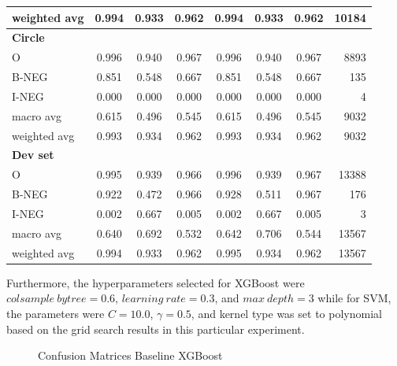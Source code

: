 \begin{table}[!ht]
\begin{tabular}{lccc|cccr}
weighted avg       &  0.994 &  0.933 &  0.962 & 0.994 & 0.933 & 0.962 & 10184 \\
\hline
\textbf{Circle}    &        &        &        &       &       &       &   \\
O                  &  0.996 &  0.940 &  0.967 & 0.996 & 0.940 & 0.967 & 8893 \\
B-NEG              &  0.851 &  0.548 &  0.667 & 0.851 & 0.548 & 0.667 & 135 \\
I-NEG              &  0.000 &  0.000 &  0.000 & 0.000 & 0.000 & 0.000 & 4 \\
macro avg          &  0.615 &  0.496 &  0.545 & 0.615 & 0.496 & 0.545 & 9032 \\
weighted avg       &  0.993 &  0.934 &  0.962 & 0.993 &  0.934 & 0.962 & 9032 \\
\hline
\textbf{Dev set}   &        &        &        &       &       &       &   \\
O                  &  0.995 &  0.939 &  0.966 & 0.996 & 0.939 & 0.967 & 13388 \\
B-NEG              &  0.922 &  0.472 &  0.966 & 0.928 & 0.511 & 0.967 & 176 \\
I-NEG              &  0.002 &  0.667 &  0.005 & 0.002 & 0.667 & 0.005 & 3 \\
macro avg          &  0.640 &  0.692 &  0.532 & 0.642 & 0.706 & 0.544 & 13567 \\
weighted avg       &  0.994 &  0.933 &  0.962 & 0.995 & 0.934 & 0.962 & 13567 \\
\hline
\end{tabular}
\end{table}






Furthermore, the hyperparameters selected for XGBoost were $colsample \ bytree = 0.6$, $learning \ rate = 0.3$, and $max \ depth = 3$ while for SVM, the parameters were $C = 10.0$, $\gamma = 0.5$, and kernel type was set to polynomial based on the grid search results in this particular experiment.

\begin{figure}[!h]
\centering
  \caption{Confusion Matrices Baseline XGBoost}
  \label{fig:base_line_xgb}
\end{figure}
